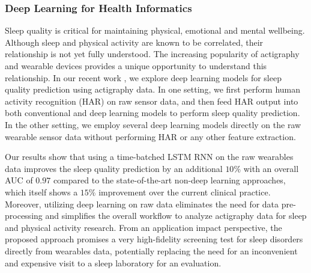 \documentclass{article} %
\begin{document}





\subsubsection{Deep Learning for Health Informatics}

Sleep quality is critical for maintaining physical, emotional and mental wellbeing. Although sleep and physical activity are known to be correlated, their relationship is not yet fully understood. The increasing popularity of actigraphy and wearable devices provides a unique opportunity to understand this relationship. In our recent work \cite{Aarti16_JMU,Aarti17_SDM}, we explore deep learning models for sleep quality prediction using actigraphy data. In one setting, we first perform human activity recognition (HAR) on raw sensor data, and then feed HAR output into both conventional and deep learning models to perform sleep quality prediction. In the other setting, we employ several deep learning models directly on the raw wearable sensor data without performing HAR or any other feature extraction.

Our results show that using a time-batched LSTM RNN on the raw wearables data improves the sleep quality prediction by an additional $10\%$ with an overall AUC of $0.97$ compared to the state-of-the-art non-deep learning approaches, which itself shows a $15\%$ improvement over the current clinical practice. Moreover, utilizing deep learning on raw data eliminates the need for data pre-processing and simplifies the overall workflow to analyze actigraphy data for sleep and physical activity research. From an application impact perspective, the proposed approach promises a very high-fidelity screening test for sleep disorders directly from wearables data, potentially replacing the need for an inconvenient and expensive visit to a sleep laboratory for an evaluation.
\end{document}
